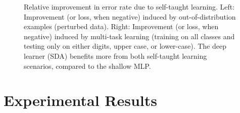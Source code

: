\documentclass{article} %
\begin{document}
\begin{figure}[ht]
\vspace*{-3mm}
\centerline{}
\vspace*{-3mm}
\caption{Relative improvement in error rate due to self-taught learning. 
Left: Improvement (or loss, when negative)
induced by out-of-distribution examples (perturbed data). 
Right: Improvement (or loss, when negative) induced by multi-task 
learning (training on all classes and testing only on either digits,
upper case, or lower-case). The deep learner (SDA) benefits more from
both self-taught learning scenarios, compared to the shallow MLP.}
\label{fig:improvements-charts}
\vspace*{-2mm}
\end{figure}

\section{Experimental Results}
\vspace*{-2mm}
\end{document}
